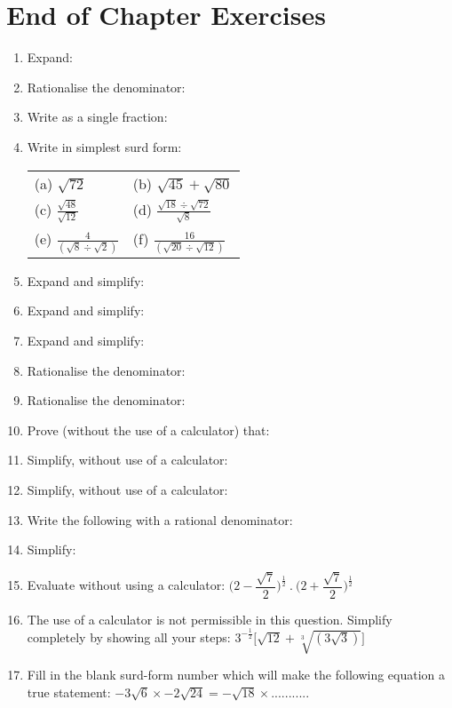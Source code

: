 \section{End of Chapter Exercises}
\begin{enumerate}
\item{Expand:
}
\item{Rationalise the denominator:
}
\item{Write as a single fraction:
}
\item{Write in simplest surd form:
\begin{center}
\begin{tabular}{p{4cm}p{4cm}}
(a) $\sqrt{72}$ & (b) $\sqrt{45} + \sqrt{80}$ \\
(c) $\frac{\sqrt{48}}{\sqrt{12}}$ & (d) $\frac{\sqrt{18} \div \sqrt{72}}{\sqrt{8}}$\\
(e) $\frac{4}{(\sqrt{8} \div \sqrt{2})}$ & (f) $\frac{16}{(\sqrt{20} \div \sqrt{12})}$\\
\end{tabular}
\end{center}
}
\item{Expand and simplify:
}
\item{Expand and simplify:
}
\item{Expand and simplify:
}

\item{Rationalise the denominator:
}
\item{Rationalise the denominator:
}
\item{Prove (without the use of a calculator) that:
}
\item{Simplify, without use of a calculator:
}
\item{Simplify, without use of a calculator:
}
\item{Write the following with a rational denominator:
}
\item{Simplify:
}
\item{Evaluate without using a calculator: $\biggl(2 - \dfrac{\sqrt{7}}{2}\biggr)^{\tfrac{1}{2}} \: . \: \biggl(2 + \dfrac{\sqrt{7}}{2}\biggr)^{\tfrac{1}{2}}$} 

\item{The use of a calculator is not permissible in this question. Simplify completely by showing all your steps: $3^{-\tfrac{1}{2}}\biggl[\sqrt{12} + \sqrt[3]{(3\sqrt{3})}\biggr]$}

\item{Fill in the blank surd-form number which will make the following equation a true statement:  $ -3\sqrt{6} \times -2\sqrt{24} = - \sqrt{18} \times ...........$}

\end{enumerate}







